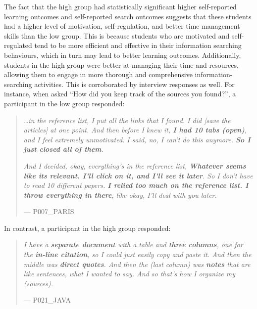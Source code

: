 \documentclass[letterpaper, nobind]{templates/ociamthesis}
\begin{document}
The fact that the high group had statistically significant higher self-reported learning outcomes and self-reported search outcomes suggests that these students had a higher level of motivation, self-regulation, and better time management skills than the low group.
This is because students who are motivated and self-regulated tend to be more efficient and effective in their information searching behaviours, which in turn may lead to better learning outcomes.
Additionally, students in the high group were better at managing their time and resources, allowing them to engage in more thorough and comprehensive information-searching activities.
This is corroborated by interview responses as well.
For instance, when asked ``How did you keep track of the sources you found?'', a participant in the low group responded:

\begin{quote}
\emph{\ldots in the reference list, I put all the links that I found. I did {[}save the articles{]} at one point. And then before I knew it, \textbf{I had 10 tabs (open)}, and I feel extremely unmotivated. I said, no, I can't do this anymore. \textbf{So I just closed all of them}.}

\emph{And I decided, okay, everything's in the reference list, \textbf{Whatever seems like its relevant. I'll click on it, and I'll see it later}. So I don't have to read 10 different papers. \textbf{I relied too much on the reference list. I throw everything in there}, like okay, I'll deal with you later.}

\hfill --- P007\_PARIS
\end{quote}

In contrast, a participant in the high group responded:

\begin{quote}
\emph{I have a \textbf{separate document} with a table and \textbf{three columns}, one for the \textbf{in-line citation}, so I could just easily copy and paste it. And then the middle was \textbf{direct quotes}. And then the (last column) was \textbf{notes} that are like sentences, what I wanted to say. And so that's how I organize my (sources).}

\hfill --- P021\_JAVA
\end{quote}
\end{document}
